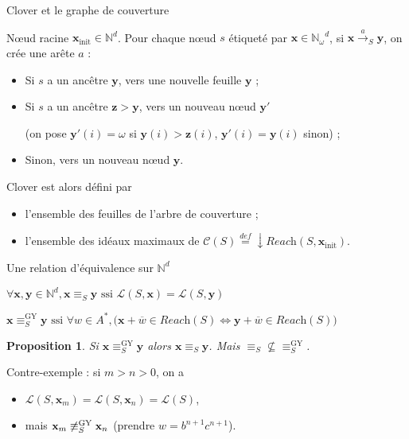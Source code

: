 \documentclass[french]{beamer}
\newcommand{\defeq}{\ensuremath{\stackrel{\textit{def}}{=}}}
\newcommand{\N}{\ensuremath{\mathbb{N}}}
\newcommand{\Nomega}{\ensuremath{\mathbb{N}_\omega}}
\newcommand{\lang}{\ensuremath{\mathcal{L}}}
\newcommand{\reach}{\ensuremath{\textit{Reach}}}
\newcommand{\cover}{\ensuremath{\mathcal{C}}}
\newcommand{\trans}[2]{\ensuremath{\stackrel{#1}{\longrightarrow}_{#2}}}
\newcommand{\vect}[1]{\ensuremath{\mathbf{#1}}}
\newcommand{\rel}{\ensuremath{\equiv}}
\newcommand{\relGY}{\ensuremath{\equiv^\text{GY}_S}}
\newcommand{\ssi}{\ensuremath{\text{ ssi }}}
\newcommand{\equivaut}{\ensuremath{\Leftrightarrow}}
\newcommand{\xinit}{\ensuremath{\vect{x}_\text{init}}}
\newcommand{\valeur}[1]{\ensuremath{\overline{#1}}}
\newtheorem{proposition}{Proposition}
\begin{document}
\begin{frame}{Clover et le graphe de couverture}
\begin{definition}
Nœud racine $\xinit \in\N^d$.
Pour chaque nœud $s$ étiqueté par $\vect{x}\in\Nomega^d$, si $\vect{x} \trans{a}{S} \vect{y}$, on crée une arête $a$ :
\begin{itemize}
    \item Si $s$ a un ancêtre $\vect{y}$, vers une nouvelle feuille $\vect{y}$ ;
    \item Si $s$ a un ancêtre $\vect{z} > \vect{y}$, vers un nouveau nœud $\vect{y'}$
    
    (on pose $\vect{y'}(i)= \omega$ si $\vect{y}(i)>\vect{z}(i)$, $\vect{y'}(i)= \vect{y}(i)$ sinon) ;
    \item Sinon, vers un nouveau nœud $\vect{y}$.
\end{itemize}
\end{definition}

\vspace{3mm}
Clover est alors défini par
\begin{itemize}
    \item l'ensemble des feuilles de l'arbre de couverture ;
    \item l'ensemble des idéaux maximaux de $\cover(S) \defeq \downarrow \reach(S,\xinit)$.
\end{itemize}
\end{frame}

\begin{frame}{Une relation d'équivalence sur $\N^d$}
\begin{definition} 
$\forall \vect{x},\vect{y}\in\N^d, \vect{x} \rel_S \vect{y} \ssi \lang(S,\vect{x}) = \lang(S,\vect{y})$
\end{definition}

\begin{definition} 
$\vect{x}\relGY\vect{y} \ssi \forall w\in A^\ast, \big( \vect{x} +\valeur{w}\in\reach(S) \equivaut \vect{y} +\valeur{w}\in\reach(S) \big)$
\end{definition}

\begin{proposition}
Si $\vect{x} \relGY \vect{y}$ alors $\vect{x} \rel_S \vect{y}$.
Mais $\rel_S \not\subseteq \relGY$.
\end{proposition}

Contre-exemple : 
si $m>n>0$, on a 
\begin{itemize}
    \item $\lang(S,\vect{x}_m) =\lang(S,\vect{x}_n) =\lang(S)$,
    \item mais $\vect{x}_m \not\relGY \vect{x}_n$ (prendre $w= b^{n+1}c^{n+1}$).
\end{itemize}
\end{frame}
\end{document}
